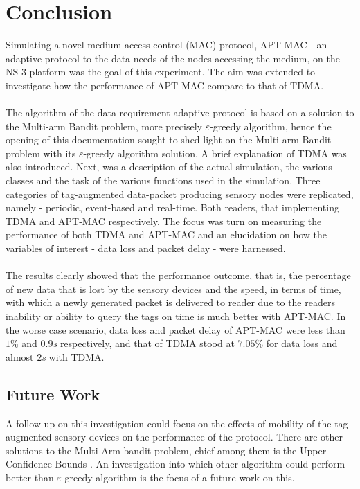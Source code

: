\chapter{Conclusion}
Simulating a novel medium access control (MAC) protocol, APT-MAC - an adaptive
protocol to the data needs of the nodes accessing the medium, on the NS-3 platform
was the goal of this experiment. The aim was extended to investigate how the
performance of APT-MAC compare to that of TDMA.\\\\
The algorithm of the data-requirement-adaptive protocol is based on a solution to
the Multi-arm Bandit problem, more precisely $\varepsilon$-greedy algorithm, hence
the opening of this documentation sought to shed light on the Multi-arm Bandit
problem with its $\varepsilon$-greedy algorithm solution. A brief explanation of
TDMA was also introduced.
Next, was a description of the actual simulation, the various classes and the
task of the various functions used in the simulation. Three categories of 
tag-augmented data-packet producing sensory nodes were replicated, namely -
periodic, event-based and real-time. Both readers, that implementing TDMA and
APT-MAC respectively. The focus was turn on measuring the performance of both
TDMA and APT-MAC and an elucidation on how the variables of interest - data loss
and packet delay - were harnessed.\\\\
The results clearly showed that the performance outcome, that is, the percentage of
new data that is lost by the sensory devices and the speed, in terms of time, with
which a newly generated packet is delivered to reader due to the readers inability
or ability to query the tags on time is much better with APT-MAC.
In the worse case scenario, data loss and packet delay of APT-MAC were less than
$1\%$ and $0.9$\textit{s} respectively, and that of TDMA stood at $7.05\%$ for
data loss and almost $2$\textit{s} with TDMA.
\section{Future Work}
A follow up on this investigation could focus on the effects of mobility of the
tag-augmented sensory devices on the performance of the protocol. There are other
solutions to the Multi-Arm bandit problem, chief among them is the Upper Confidence
Bounds \cite{Sutton&Barto}. An investigation into which other algorithm could
perform better than $\varepsilon$-greedy algorithm is the focus of a future work
on this.


